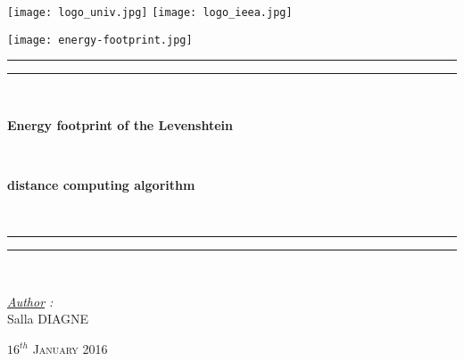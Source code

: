 \thispagestyle{cover}

\texttt{[image: logo\_univ.jpg]}
 \hfill \texttt{[image: logo\_ieea.jpg]} \\

\vspace*{10mm}

\begin{center}
	
	\texttt{[image: energy-footprint.jpg]}
	
	\vspace*{12mm}	

	\rule[0.5ex]{\linewidth}{2pt}\vspace*{-\baselineskip}\vspace*{3.2pt}
	\rule[0.5ex]{\linewidth}{1pt}\\[\baselineskip]

		\begin{Huge} \textbf{Energy footprint of the Levenshtein} \end{Huge}\\[4mm]
		\begin{Huge} \textbf{distance computing algorithm} \end{Huge}\\[4mm]
	\rule[0.5ex]{\linewidth}{1pt}\vspace*{-\baselineskip}\vspace{3.2pt}
	\rule[0.5ex]{\linewidth}{2pt}\\

	\vspace*{20mm}

	{\LARGE \textit{\underline{Author} :}}\\
	\vspace*{6mm}
	{\LARGE Salla DIAGNE}\\
	
	\vspace*{20mm}
	
	{\LARGE\textsc{$16^{th}$ January 2016}}
\end{center}